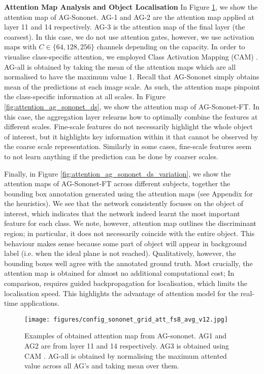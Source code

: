 \documentclass{article}
\begin{document}
\textbf{Attention Map Analysis and Object Localisation} In Figure \ref{fig:attention_ag_sononet}, we show the attention map of AG-Sononet. AG-1 and AG-2 are the attention map applied at layer 11 and 14 respectively. AG-3 is the attention map of the final layer (the coarsest). In this case, we do not use attention gates, however, we use activation maps with $C \in \{64, 128, 256\}$ channels depending on the capacity. In order to visualise class-specific attention, we employed Class Activation Mapping (CAM) \cite{zhou2016learning}. AG-all is obtained by taking the mean of the attention maps which are all normalised to have the maximum value 1. Recall that AG-Sononet simply obtains mean of the predictions at each image scale. As such, the attention maps pinpoint the class-specific information at all scales. In Figure \ref{fig:attention_ag_sononet_ds}, we show the attention map of AG-Sononet-FT. In this case, the aggregation layer relearns how to optimally combine the features at different scales. Fine-scale features do not necessarily highlight the whole object of interest, but it highlights key information within it that cannot be observed by the coarse scale representation. Similarly in some cases, fine-scale features seem to not learn anything if the prediction can be done by coarser scales.

Finally, in Figure \ref{fig:attention_ag_sononet_ds_variation}, we show the attention maps of AG-Sononet-FT across different subjects, together the bounding box annotation generated using the attention maps (see Appendix for the heuristics). We see that the network consistently focuses on the object of interest, which indicates that the network indeed learnt the most important feature for each class. We note, however, attention map outlines the discriminant region; in particular, it does not necessarily coincide with the entire object. This behaviour makes sense because some part of object will appear in background label (i.e. when the ideal plane is not reached). Qualitatively, however, the bounding boxes well agree with the annotated ground truth. Most crucially, the attention map is obtained for almost no additional computational cost; In comparison, \cite{baumgartner2016real} requires guided backpropagation for localisation, which limits the localisation speed. This highlights the advantage of attention model for the real-time applications.

\begin{figure}[!t]
	\centering
	\texttt{[image: figures/config\_sononet\_grid\_att\_fs8\_avg\_v12.jpg]}
	\caption{Examples of obtained attention map from AG-sononet. AG1 and AG2 are from layer 11 and 14 respectively. AG3 is obtained using CAM  \cite{zhou2016learning}. AG-all is obtained by normalising the maximum attented value across all AG's and taking mean over them.}
	\label{fig:attention_ag_sononet}
\end{figure}
\end{document}
